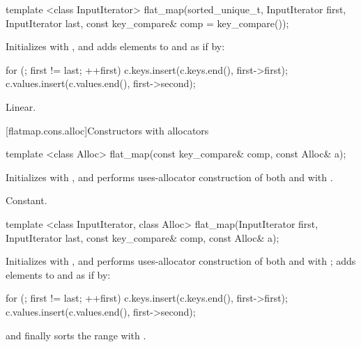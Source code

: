 \begin{codeblock}
\begin{codeblock}
\begin{codeblock}
\begin{addedblock}
%
\begin{itemdecl}
template <class InputIterator>
  flat_map(sorted_unique_t, InputIterator first, InputIterator last,
           const key_compare& comp = key_compare());
\end{itemdecl}

\begin{itemdescr}
\pnum
\effects Initializes  with , and adds elements to
 and  as if by:
\begin{codeblock}
for (; first != last; ++first) {
  c.keys.insert(c.keys.end(), first->first);
  c.values.insert(c.values.end(), first->second);
}
\end{codeblock}

\pnum
\complexity
Linear.
\end{itemdescr}

[flatmap.cons.alloc]{Constructors with allocators}

%
\begin{itemdecl}
template <class Alloc>
  flat_map(const key_compare& comp, const Alloc& a);
\end{itemdecl}

\begin{itemdescr}
\pnum
\effects Initializes  with , and performs
uses-allocator construction of both
 and  with .

\pnum
\complexity
Constant.
\end{itemdescr}

%
\begin{itemdecl}
template <class InputIterator, class Alloc>
  flat_map(InputIterator first, InputIterator last,
           const key_compare& comp, const Alloc& a);
\end{itemdecl}

\begin{itemdescr}
\pnum
\effects Initializes  with , and performs
uses-allocator construction of both
 and  with ; adds elements to
 and  as if by:
\begin{codeblock}
for (; first != last; ++first) {
  c.keys.insert(c.keys.end(), first->first);
  c.values.insert(c.values.end(), first->second);
}
\end{codeblock}
and finally sorts the range  with .


\end{itemdescr}
\end{addedblock}
\end{codeblock}
\end{codeblock}
\end{codeblock}
